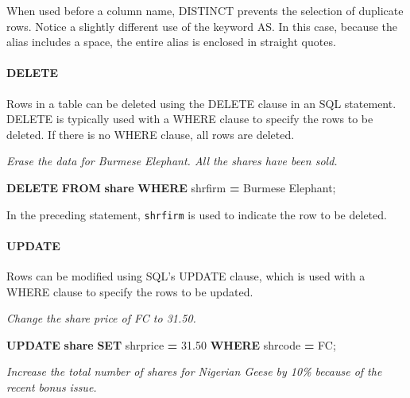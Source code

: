 \documentclass[
]{article}
\newenvironment{Shaded}{\begin{snugshade}}{\end{snugshade}}
\newcommand{\FloatTok}[1]{\textcolor[rgb]{0.00,0.00,0.81}{#1}}
\newcommand{\KeywordTok}[1]{\textcolor[rgb]{0.13,0.29,0.53}{\textbf{#1}}}
\newcommand{\NormalTok}[1]{#1}
\newcommand{\OperatorTok}[1]{\textcolor[rgb]{0.81,0.36,0.00}{\textbf{#1}}}
\newcommand{\StringTok}[1]{\textcolor[rgb]{0.31,0.60,0.02}{#1}}
\begin{document}
When used before a column name, DISTINCT prevents the selection of duplicate rows. Notice a slightly different use of the keyword AS. In this case, because the alias includes a space, the entire alias is enclosed in straight quotes.

\hypertarget{delete}{%
\paragraph*{DELETE}\label{delete}}

Rows in a table can be deleted using the DELETE clause in an SQL statement. DELETE is typically used with a WHERE clause to specify the rows to be deleted. If there is no WHERE clause, all rows are deleted.

\emph{Erase the data for Burmese Elephant. All the shares have been sold.}

\begin{Shaded}
\begin{Highlighting}[]
\KeywordTok{DELETE} \KeywordTok{FROM} \KeywordTok{share} \KeywordTok{WHERE}\NormalTok{ shrfirm }\OperatorTok{=} \StringTok{\textquotesingle{}Burmese Elephant\textquotesingle{}}\NormalTok{;}
\end{Highlighting}
\end{Shaded}

In the preceding statement, \texttt{shrfirm} is used to indicate the row to be deleted.

\hypertarget{update}{%
\paragraph*{UPDATE}\label{update}}

Rows can be modified using SQL's UPDATE clause, which is used with a WHERE clause to specify the rows to be updated.

\emph{Change the share price of FC to 31.50.}

\begin{Shaded}
\begin{Highlighting}[]
\KeywordTok{UPDATE} \KeywordTok{share} \KeywordTok{SET}\NormalTok{ shrprice }\OperatorTok{=} \FloatTok{31.50} \KeywordTok{WHERE}\NormalTok{ shrcode }\OperatorTok{=} \StringTok{\textquotesingle{}FC\textquotesingle{}}\NormalTok{;}
\end{Highlighting}
\end{Shaded}

\emph{Increase the total number of shares for Nigerian Geese by 10\% because of the recent bonus issue.}
\end{document}
